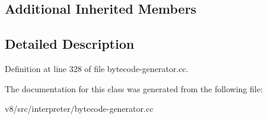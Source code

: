\subsection*{Additional Inherited Members}


\subsection{Detailed Description}


Definition at line 328 of file bytecode-\/generator.\+cc.



The documentation for this class was generated from the following file\+:\begin{DoxyCompactItemize}
\item 
v8/src/interpreter/bytecode-\/generator.\+cc\end{DoxyCompactItemize}
